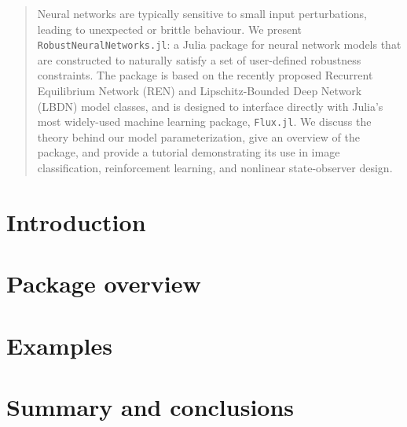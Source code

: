\documentclass{juliacon}
\begin{document}


\maketitle


\begin{abstract}

Neural networks are typically sensitive to small input perturbations, leading to unexpected or brittle behaviour. 
We present \verb|RobustNeuralNetworks.jl|: a Julia package for neural network models that are constructed to naturally satisfy a set of user-defined robustness constraints. The package is based on the recently proposed Recurrent Equilibrium Network (REN) and Lipschitz-Bounded Deep Network (LBDN) model classes, and is designed to interface directly with Julia's most widely-used machine learning package, \verb|Flux.jl|. We discuss the theory behind our model parameterization, give an overview of the package, and provide a tutorial demonstrating its use in image classification, reinforcement learning, and nonlinear state-observer design.

\end{abstract}

\section{Introduction} \label{sec:introduction}


\section{Package overview} \label{sec:overview}


\section{Examples} \label{sec:examples}





\section{Summary and conclusions} \label{sec:conc}






\end{document}
